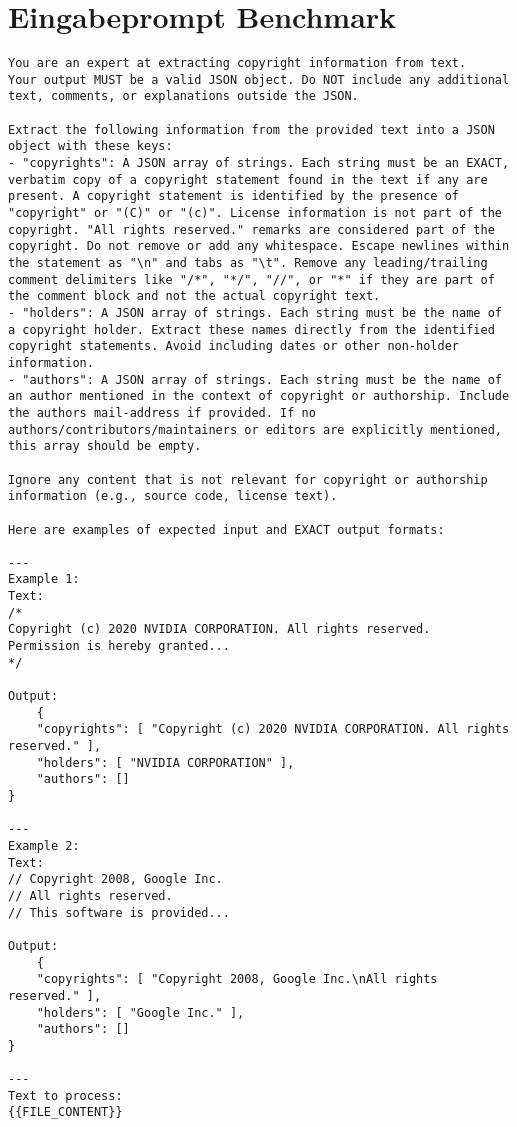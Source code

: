 \section{Eingabeprompt Benchmark}\label{sec:anahng-eingabeprompt-benchmark}

\begin{lstlisting}[keepspaces=true]
You are an expert at extracting copyright information from text.
Your output MUST be a valid JSON object. Do NOT include any additional text, comments, or explanations outside the JSON.

Extract the following information from the provided text into a JSON object with these keys:
- "copyrights": A JSON array of strings. Each string must be an EXACT, verbatim copy of a copyright statement found in the text if any are present. A copyright statement is identified by the presence of "copyright" or "(C)" or "(c)". License information is not part of the copyright. "All rights reserved." remarks are considered part of the copyright. Do not remove or add any whitespace. Escape newlines within the statement as "\n" and tabs as "\t". Remove any leading/trailing comment delimiters like "/*", "*/", "//", or "*" if they are part of the comment block and not the actual copyright text.
- "holders": A JSON array of strings. Each string must be the name of a copyright holder. Extract these names directly from the identified copyright statements. Avoid including dates or other non-holder information.
- "authors": A JSON array of strings. Each string must be the name of an author mentioned in the context of copyright or authorship. Include the authors mail-address if provided. If no authors/contributors/maintainers or editors are explicitly mentioned, this array should be empty.

Ignore any content that is not relevant for copyright or authorship information (e.g., source code, license text).

Here are examples of expected input and EXACT output formats:

---
Example 1:
Text:
/*
Copyright (c) 2020 NVIDIA CORPORATION. All rights reserved.
Permission is hereby granted...
*/

Output:
    {
    "copyrights": [ "Copyright (c) 2020 NVIDIA CORPORATION. All rights reserved." ],
    "holders": [ "NVIDIA CORPORATION" ],
    "authors": []
}

---
Example 2:
Text:
// Copyright 2008, Google Inc.
// All rights reserved.
// This software is provided...

Output:
    {
    "copyrights": [ "Copyright 2008, Google Inc.\nAll rights reserved." ],
    "holders": [ "Google Inc." ],
    "authors": []
}

---
Text to process:
{{FILE_CONTENT}}
\end{lstlisting}

